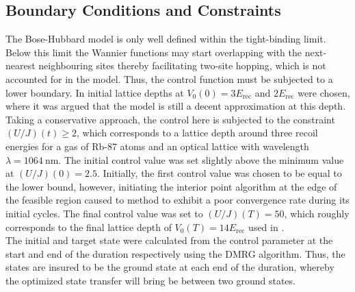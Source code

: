 \subsection{Boundary Conditions and Constraints}
The Bose-Hubbard model is only well defined within the tight-binding limit. Below this limit the Wannier functions may start overlapping with the next-nearest neighbouring sites thereby facilitating two-site hopping, which is not accounted for in the model. Thus, the control function must be subjected to a lower boundary. In \cite{FrankBloch,Doria2011} initial lattice depths at $V_0 (0) = 3 E_{\mathrm{rec}}$ and $2 E_{\mathrm{rec}}$ were chosen, where it was argued that the model is still a decent approximation at this depth.
Taking a conservative approach, the control here is subjected to the constraint $\left( U/J \right) (t) \geq 2$, which corresponds to a lattice depth around three recoil energies for a gas of Rb-87 atoms and an optical lattice with wavelength $\lambda = 1064 \: \mathrm{nm}$. 
The initial control value was set slightly above the minimum value at $(U/J) (0) = 2.5$. Initially, the first control value was chosen to be equal to the lower bound, however, initiating the interior point algorithm at the edge of the feasible region caused to method to exhibit a poor convergence rate during its initial cycles.
The final control value was set to $(U/J) (T) = 50$, which roughly corresponds to the final lattice depth of $V_0 (T) = 14 E_{\mathrm{rec}}$ used in \cite{FrankBloch}.\\
The initial and target state were calculated from the control parameter at the start and end of the duration respectively using the DMRG algorithm. Thus, the states are insured to be the ground state at each end of the duration, whereby the optimized state transfer will bring be between two ground states.


